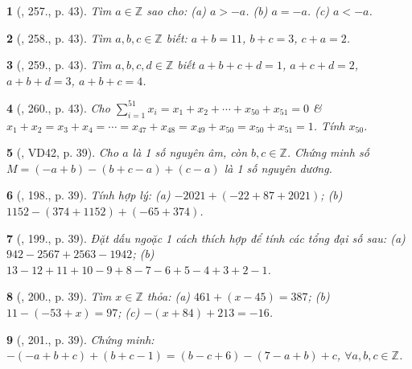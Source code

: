\documentclass{article}
\newtheorem{baitoan}{}
\begin{document}
\begin{baitoan}[\cite{Binh_Toan_6_tap_1}, 257., p. 43]
	Tìm $a\in\mathbb{Z}$ sao cho: (a) $a > -a$. (b) $a = -a$. (c) $a < -a$.
\end{baitoan}

\begin{baitoan}[\cite{Binh_Toan_6_tap_1}, 258., p. 43]
	Tìm $a,b,c\in\mathbb{Z}$ biết: $a + b = 11$, $b + c = 3$, $c + a = 2$.
\end{baitoan}

\begin{baitoan}[\cite{Binh_Toan_6_tap_1}, 259., p. 43]
	Tìm $a,b,c,d\in\mathbb{Z}$ biết $a + b + c + d = 1$, $a + c + d = 2$, $a + b + d = 3$, $a + b + c = 4$.
\end{baitoan}

\begin{baitoan}[\cite{Binh_Toan_6_tap_1}, 260., p. 43]
	Cho $\sum_{i=1}^{51} x_i = x_1 + x_2 + \cdots + x_{50} + x_{51} = 0$ \& $x_1 + x_2 = x_3 + x_4 = \cdots = x_{47} + x_{48} = x_{49} + x_{50} = x_{50} + x_{51} = 1$. Tính $x_{50}$.
\end{baitoan}

\begin{baitoan}[\cite{Tuyen_Toan_6}, VD42, p. 39]
	Cho $a$ là 1 số nguyên âm, còn $b,c\in\mathbb{Z}$. Chứng minh số $M = (-a + b) - (b + c - a) + (c - a)$ là 1 số nguyên dương.
\end{baitoan}

\begin{baitoan}[\cite{Tuyen_Toan_6}, 198., p. 39]
	Tính hợp lý: (a) $-2021 + (-22 + 87 + 2021)$; (b) $1152 - (374 + 1152) + (-65 + 374)$.
\end{baitoan}

\begin{baitoan}[\cite{Tuyen_Toan_6}, 199., p. 39]
	Đặt dấu ngoặc 1 cách thích hợp để tính các tổng đại số sau: (a) $942 - 2567 + 2563 - 1942$; (b) $13 - 12 + 11 + 10 - 9 + 8 - 7 - 6 + 5 - 4 + 3 + 2 - 1$.
\end{baitoan}

\begin{baitoan}[\cite{Tuyen_Toan_6}, 200., p. 39]
	Tìm $x\in\mathbb{Z}$ thỏa: (a) $461 + (x - 45) = 387$; (b) $11 - (-53 + x) = 97$; (c) $-(x + 84) + 213 = -16$.
\end{baitoan}

\begin{baitoan}[\cite{Tuyen_Toan_6}, 201., p. 39]
	Chứng minh: $-(-a + b + c) + (b + c - 1) = (b - c + 6) - (7 - a + b) + c$, $\forall a,b,c\in\mathbb{Z}$.
\end{baitoan}
\end{document}
